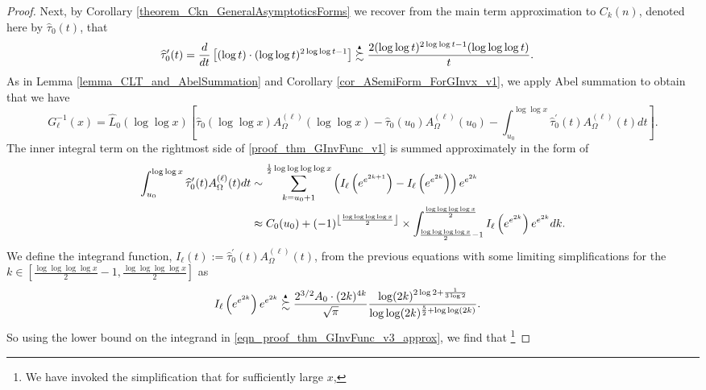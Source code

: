 \documentclass[11pt,reqno,a4letter]{article}
\numberwithin{figure}{section}
\numberwithin{table}{section}
\newcommand{\Floor}[2]{\ensuremath{\left\lfloor \frac{#1}{#2} \right\rfloor}}
\theoremstyle{plain}
\numberwithin{theorem}{section}
\theoremstyle{definition}
\newcommand{\SuccSim}[0]{\overset{_{\scriptsize{\blacktriangle}}}{\succsim}}
\begin{document}
\begin{proof}
Next, by Corollary \ref{theorem_Ckn_GeneralAsymptoticsForms} 
we recover from the main term approximation to $C_k(n)$, denoted here by 
$\widehat{\tau}_0(t)$, that 
\begin{align*} 
\widehat{\tau}_0^{\prime}(t) & = \frac{d}{dt}\left[ 
     (\log t) \cdot (\log\log t)^{2\log\log t-1} 
     \right] \SuccSim 
     \frac{2 (\log\log t)^{2\log\log t-1} (\log\log\log t)}{t}. 
\end{align*} 
As in Lemma \ref{lemma_CLT_and_AbelSummation} and Corollary \ref{cor_ASemiForm_ForGInvx_v1}, 
we apply Abel summation to obtain that we have 
\begin{equation} 
\label{proof_thm_GInvFunc_v1} 
G_{\ell}^{-1}(x) = \widehat{L}_0(\log\log x) \left[
     \widehat{\tau}_0(\log\log x) A_{\Omega}^{(\ell)}(\log\log x) - 
     \widehat{\tau}_0(u_0) A_{\Omega}^{(\ell)}(u_0) - \int_{u_0}^{\log\log x} 
     \widehat{\tau}_0^{\prime}(t) A_{\Omega}^{(\ell)}(t) dt\right]. 
\end{equation} 
The inner integral term on the rightmost side of \eqref{proof_thm_GInvFunc_v1} 
is summed approximately in the form of 
\begin{align} 
\label{eqn_proof_thm_GInvFunc_v3_approx} 
\int_{u_0}^{\log\log x} \widehat{\tau}_0^{\prime}(t) A_{\Omega}^{(\ell)}(t) dt & \sim 
     \sum_{k=u_0+1}^{\frac{1}{2}\log\log\log\log x} \left( 
     I_{\ell}\left(e^{e^{2k+1}}\right) - 
     I_{\ell}\left(e^{e^{2k}}\right) 
     \right) e^{e^{2k}} \\ 
\notag 
     & \approx 
     C_0(u_0) + 
     (-1)^{\Floor{\log\log\log\log x}{2}} \times 
     \int_{\frac{\log\log\log\log x}{2}-1}^{\frac{\log\log\log\log x}{2}} 
     I_{\ell}\left(e^{e^{2k}}\right) 
     e^{e^{2k}} dk. 
\end{align} 
We define the integrand function, 
$I_{\ell}(t) := \widehat{\tau}_0^{\prime}(t) A_{\Omega}^{(\ell)}(t)$, 
from the previous equations with some limiting simplifications for the 
$k \in \left[\frac{\log\log\log\log x}{2}-1, \frac{\log\log\log\log x}{2}\right]$ as 
\begin{align} 
\label{eqn_proof_thm_GInvFunc_v3_approx} 
I_{\ell}\left(e^{e^{2k}}\right) e^{e^{2k}}& \SuccSim 
     \frac{2^{3/2} A_0 \cdot (2k)^{4k}}{\sqrt{\pi}} 
     \frac{\log(2k)^{2\log 2 + \frac{1}{3\log 2}}}{\log\log(2k)^{\frac{5}{2} + \log\log(2k)}}. 
\end{align} 
So using the lower bound on the integrand in \eqref{eqn_proof_thm_GInvFunc_v3_approx}, 
we find that \footnote{ 
     We have invoked the simplification that for sufficiently large $x$, 
}
\end{proof}
\end{document}
